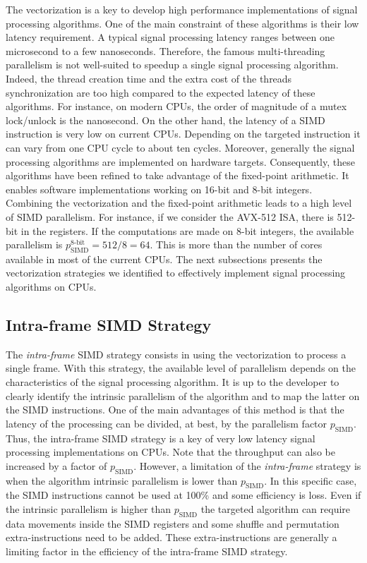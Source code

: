 The vectorization is a key to develop high performance implementations of signal
processing algorithms. One of the main constraint of these algorithms is their
low latency requirement. A typical signal processing latency ranges between
one microsecond to a few nanoseconds. Therefore, the famous multi-threading
parallelism is not well-suited to speedup a single signal processing algorithm.
Indeed, the thread creation time and the extra cost of the threads
synchronization are too high compared to the expected latency of these
algorithms. For instance, on modern CPUs, the order of magnitude of a mutex
lock/unlock is the nanosecond. On the other hand, the latency of a SIMD
instruction is very low on current CPUs. Depending on the targeted instruction
it can vary from one CPU cycle to about ten cycles. Moreover, generally the
signal processing algorithms are implemented on hardware targets. Consequently,
these algorithms have been refined to take advantage of the fixed-point
arithmetic. It enables software implementations working on 16-bit and 8-bit
integers. Combining the vectorization and the fixed-point arithmetic leads to a
high level of SIMD parallelism. For instance, if we consider the AVX-512 ISA,
there is 512-bit in the registers. If the computations are made on 8-bit
integers, the available parallelism is $p^\text{8-bit}_\text{SIMD} = 512 / 8 =
64$. This is more than the number of cores available in most of the current
CPUs. The next subsections presents the vectorization strategies we identified
to effectively implement signal processing algorithms on CPUs.

\subsection{Intra-frame SIMD Strategy}
\label{sec:opt_vec_intra}

The \emph{intra-frame} SIMD strategy consists in using the vectorization to
process a single frame. With this strategy, the available level of parallelism
depends on the characteristics of the signal processing algorithm. It is up to
the developer to clearly identify the intrinsic parallelism of the algorithm and
to map the latter on the SIMD instructions. One of the main advantages of this
method is that the latency of the processing can be divided, at best, by the
parallelism factor $p_\text{SIMD}$. Thus, the intra-frame SIMD strategy is a key
of very low latency signal processing implementations on CPUs. Note that the
throughput can also be increased by a factor of $p_\text{SIMD}$. However, a
limitation of the \emph{intra-frame} strategy is when the algorithm intrinsic
parallelism is lower than $p_\text{SIMD}$. In this specific case, the SIMD
instructions cannot be used at 100\% and some efficiency is loss. Even if the
intrinsic parallelism is higher than $p_\text{SIMD}$ the targeted algorithm can
require data movements inside the SIMD registers and some shuffle and
permutation extra-instructions need to be added. These extra-instructions are
generally a limiting factor in the efficiency of the intra-frame SIMD strategy.

